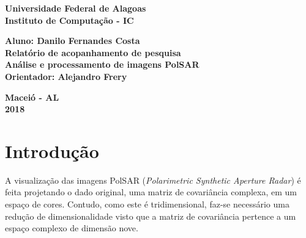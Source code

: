 \documentclass[12pt]{article}
\begin{document}
\begin{titlepage}
\begin{center}

\textbf{\LARGE Universidade Federal de Alagoas } \\[0.5cm]
\textbf{\large Instituto de Computação - IC}\\[0.2cm]

\vspace{20pt}

\vspace{20pt}
\vspace{20pt}
\vspace{20pt}
\vspace{20pt}
\vspace{20pt}
\vspace{20pt}
\vspace{20pt}
\vspace{20pt}

\textbf{\Large Aluno: Danilo Fernandes Costa}\\
\vspace{70pt}
\textbf{\LARGE Relatório de acopanhamento de pesquisa}\\
\vspace{20pt}
\textbf{\Large Análise e processamento de imagens PolSAR}\\
\vspace{70pt}
\textbf{\large Orientador: Alejandro Frery}\\

\vspace{45pt}
\end{center}

\par
\vfill
\begin{center}
\textbf{Maceió - AL}\\
\textbf{2018}
\end{center}

\end{titlepage}

\newpage

\section{Introdução}

A visualização das imagens PolSAR (\textit{Polarimetric Synthetic Aperture Radar}) é feita projetando o dado original, uma matriz de covariância complexa, em um espaço de cores. 
Contudo, como este é tridimensional, faz-se necessário uma redução de dimensionalidade visto que a matriz de covariância pertence a um espaço complexo de dimensão nove.
\end{document}
